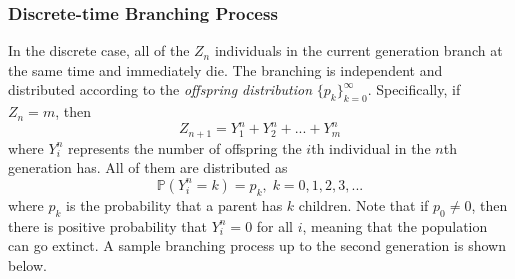 \documentclass{article}
\theoremstyle{remark}
\theoremstyle{definition}
\begin{document}
\subsubsection{Discrete-time Branching Process}
In the discrete case, all of the $Z_n$ individuals in the current generation branch at the same time and immediately die. The branching is independent and distributed according to the \textit{offspring distribution} $\{p_k\}_{k=0}^\infty$. Specifically, if $Z_n = m$, then 
\[Z_{n+1} = Y_1^n + Y_2^n + ... + Y_m^n\]
where $Y_i^n$ represents the number of offspring the $i$th individual in the $n$th generation has. All of them are distributed as
\[\mathbb{P}(Y_i^n = k) = p_k, \; k = 0, 1, 2, 3, ...\]
where $p_k$ is the probability that a parent has $k$ children. Note that if $p_0 \neq 0$, then there is positive probability that $Y_i^n = 0$ for all $i$, meaning that the population can go extinct. A sample branching process up to the second generation is shown below. 
\begin{center}
\end{center}
\end{document}
